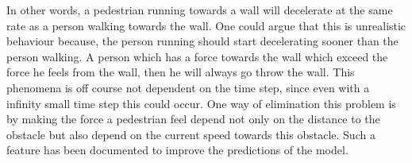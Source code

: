 In other words, a pedestrian running towards a wall will decelerate at the same rate as a person walking towards the wall. One could argue that this is unrealistic behaviour because, the person running should start decelerating sooner than the person walking. A person which has a force towards the wall which exceed the force he feels from the wall, then he will always go throw the wall. This phenomena is off course not dependent on the time step, since even with a infinity small time step this could occur. One way of elimination this problem is by making the force a pedestrian feel depend not only on the distance to the obstacle but also depend on the current speed towards this obstacle. Such a feature has been documented to improve the predictions of the model\cite{ABconstant}.
\begin{figure}
\centering
{}

\end{figure}
